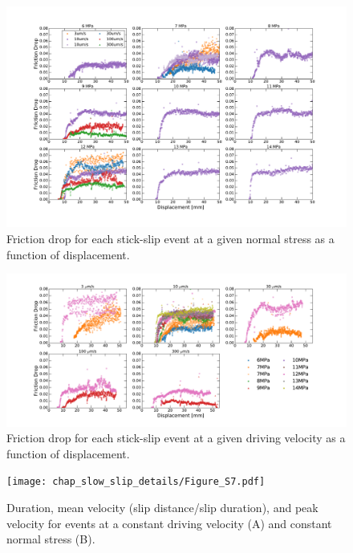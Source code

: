 \begin{figure}
	\centering
		\includegraphics[scale=0.35]{chap_slow_slip_details/Figure_S5.pdf}
   	\caption{Friction drop for each stick-slip event at a given normal stress as a function of displacement.}
  	\label{Figure_S5}
\end{figure}

\clearpage

\begin{figure}
	\centering
		\includegraphics[scale=0.35]{chap_slow_slip_details/Figure_S6.pdf}
   	\caption{Friction drop for each stick-slip event at a given driving velocity as a function of displacement.}
  	\label{Figure_S6}
\end{figure}

\clearpage

\begin{figure}
	\centering
		\texttt{[image: chap\_slow\_slip\_details/Figure\_S7.pdf]}
   	\caption{Duration, mean velocity (slip distance/slip duration), and peak velocity for events at a constant driving velocity (A) and constant normal stress (B).}
  	\label{Figure_S7}
\end{figure}
